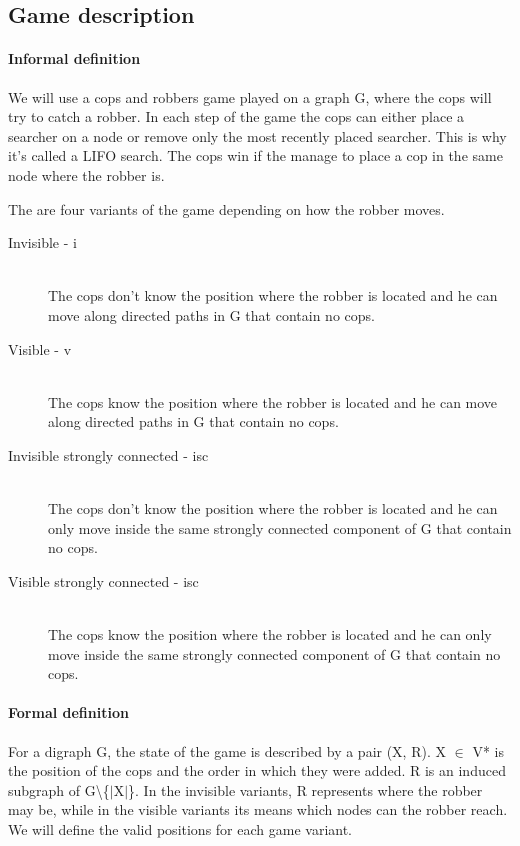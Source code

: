 \subsection{Game description}
\paragraph{Informal definition}
We will use a cops and robbers game played on a graph G, where the cops will try to catch a robber. In each step of the game the cops can either place a searcher on a node or remove only the most recently placed searcher. This is why it's called a LIFO search. The cops win if the manage to place a cop in the same node where the robber is.

The are four variants of the game depending on how the robber moves. 
\begin{description}
\item[Invisible - i] \hfill \\
The cops don't know the position where the robber is located and he can move along directed paths in G that contain no cops.
\item[Visible - v] \hfill \\
The cops know the position where the robber is located and he can move along directed paths in G that contain no cops.
\item[Invisible strongly connected - isc] \hfill \\
The cops don't know the position where the robber is located and he can only move inside the same strongly connected component of G that contain no cops.
\item[Visible strongly connected - isc] \hfill \\
The cops know the position where the robber is located and he can only move inside the same strongly connected component of G that contain no cops.
\end{description}

\paragraph{Formal definition}
For a digraph G, the state of the game is described by a pair (X, R). X $\in$ V* is the position of the cops and the order in which they were added. R is an induced subgraph of G\textbackslash \{$|$X$|$\}. In the invisible variants, R represents where the robber may be, while in the visible variants its means which nodes can the robber reach. We will define the valid positions for each game variant.

